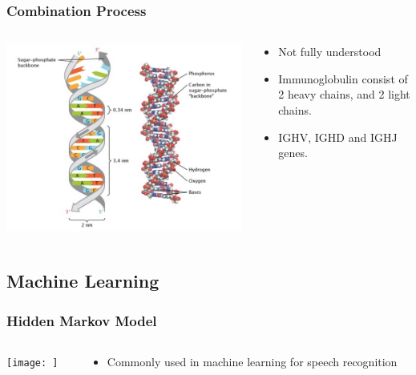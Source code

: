 \documentclass{beamer}
\begin{document}
\begin{frame}
\frametitle{Combination Process}
\begin{columns}
  \begin{column}{.5\textwidth} 
    \includegraphics[width=\textwidth]{dna-strand.jpg}
  \end{column}
  \begin{column}{.5\textwidth} 
    \begin{itemize}
      \item Not fully understood
      \item Immunoglobulin consist of 2 heavy chains, and 2 light chains.
      \item IGHV, IGHD and IGHJ genes.
    \end{itemize}
  \end{column}
\end{columns}
\end{frame}

\subsection{Machine Learning}

\begin{frame}
\frametitle{Hidden Markov Model}
\begin{columns}
  \begin{column}{.5\textwidth} 
    \texttt{[image: ]}
  \end{column}
  \begin{column}{.5\textwidth} 
    \begin{itemize}
      \item Commonly used in machine learning for speech recognition
    \end{itemize}
  \end{column}
\end{columns}
\end{frame}
\end{document}
